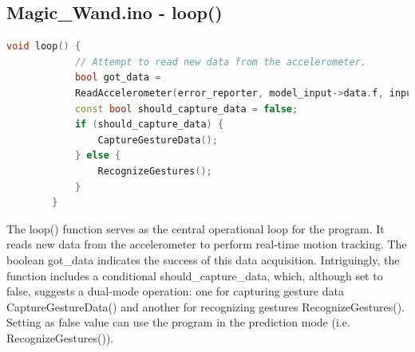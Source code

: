 		\subsection{Magic\_Wand.ino - loop()}
	\begin{lstlisting}[language=C++, caption={Main Loop for Gesture Recognition or Data Capture}, label={code:loop-function}, style=bashstyle]
		void loop() {
			// Attempt to read new data from the accelerometer.
			bool got_data =
			ReadAccelerometer(error_reporter, model_input->data.f, input_length);
			const bool should_capture_data = false;
			if (should_capture_data) {
				CaptureGestureData();
			} else {
				RecognizeGestures();
			}
		}
	\end{lstlisting}
	
		
		The loop() function serves as the central operational loop for the program. It reads new data from the accelerometer to perform real-time motion tracking. The boolean got\_data indicates the success of this data acquisition. Intriguingly, the function includes a conditional should\_capture\_data, which, although set to false, suggests a dual-mode operation: one for capturing gesture data CaptureGestureData() and another for recognizing gestures RecognizeGestures(). Setting as false value can use the program in the prediction mode (i.e. RecognizeGestures()). 
		
